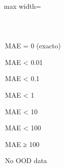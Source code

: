 \begin{table}[htbp]
\begin{adjustbox}{max width=\linewidth}
\begin{tabular}{p{2.4cm} p{2.6cm} p{2.6cm} p{2.6cm} p{2.6cm} p{2.6cm} p{2.6cm} p{2.6cm} p{2.6cm}}
    \bottomrule
  \end{tabular}
  \end{adjustbox}
  \\[4pt]
  \footnotesize
  \colorbox{ood0}{\strut\,MAE = 0 (exacto)\,}\quad \colorbox{ood1}{\strut\,MAE < 0.01\,}\quad \colorbox{ood2}{\strut\,MAE < 0.1\,}\quad \colorbox{ood3}{\strut\,MAE < 1\,}\quad \colorbox{ood4}{\strut\,MAE < 10\,}\quad \colorbox{ood5}{\strut\,MAE < 100\,}\quad \colorbox{ood6}{\strut\,MAE ≥ 100\,}\quad \colorbox{oodnull}{\strut\,No OOD data\,}
\end{table}

